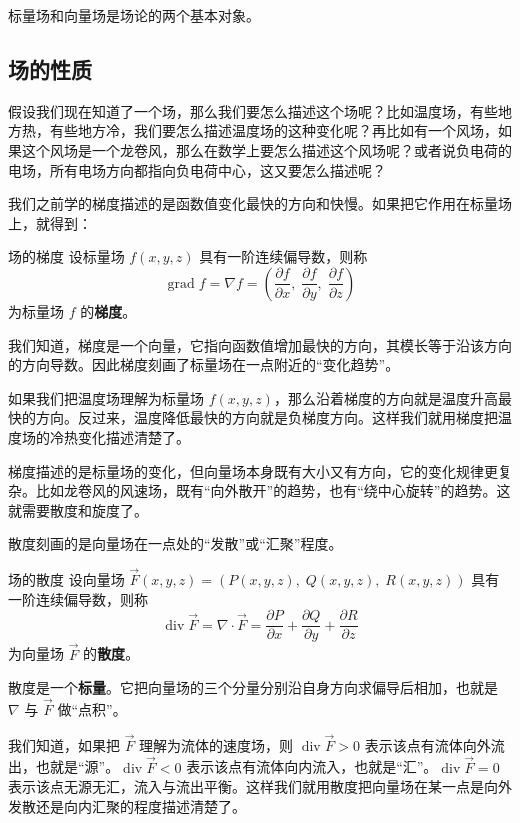 标量场和向量场是场论的两个基本对象。

\subsection{场的性质}
假设我们现在知道了一个场，那么我们要怎么描述这个场呢？比如温度场，有些地方热，有些地方冷，我们要怎么描述温度场的这种变化呢？再比如有一个风场，如果这个风场是一个龙卷风，那么在数学上要怎么描述这个风场呢？或者说负电荷的电场，所有电场方向都指向负电荷中心，这又要怎么描述呢？

我们之前学的梯度描述的是函数值变化最快的方向和快慢。如果把它作用在标量场上，就得到：

\begin{definition}{场的梯度}{}
  设标量场 \(f(x,y,z)\) 具有一阶连续偏导数，则称
  \[
  \operatorname{grad} f = \nabla f = \left(\frac{\partial f}{\partial x},\; \frac{\partial f}{\partial y},\; \frac{\partial f}{\partial z}\right)
  \]
  为标量场 \(f\) 的\textbf{梯度}。
\end{definition}

我们知道，梯度是一个向量，它指向函数值增加最快的方向，其模长等于沿该方向的方向导数。因此梯度刻画了标量场在一点附近的“变化趋势”。

如果我们把温度场理解为标量场 \(f(x,y,z)\)，那么沿着梯度的方向就是温度升高最快的方向。反过来，温度降低最快的方向就是负梯度方向。这样我们就用梯度把温度场的冷热变化描述清楚了。

梯度描述的是标量场的变化，但向量场本身既有大小又有方向，它的变化规律更复杂。比如龙卷风的风速场，既有“向外散开”的趋势，也有“绕中心旋转”的趋势。这就需要散度和旋度了。

散度刻画的是向量场在一点处的“发散”或“汇聚”程度。

\begin{definition}{场的散度}{}
  设向量场 \(\vec{F}(x,y,z)=(P(x,y,z),\;Q(x,y,z),\;R(x,y,z))\) 具有一阶连续偏导数，则称
  \[
  \operatorname{div}\vec{F} = \nabla \cdot \vec{F} = \frac{\partial P}{\partial x} + \frac{\partial Q}{\partial y} + \frac{\partial R}{\partial z}
  \]
  为向量场 \(\vec{F}\) 的\textbf{散度}。
\end{definition}

散度是一个\textbf{标量}。它把向量场的三个分量分别沿自身方向求偏导后相加，也就是 \(\nabla\) 与 \(\vec{F}\) 做“点积”。

我们知道，如果把 \(\vec{F}\) 理解为流体的速度场，则 \(\operatorname{div}\vec{F}>0\) 表示该点有流体向外流出，也就是“源”。\(\operatorname{div}\vec{F}<0\) 表示该点有流体向内流入，也就是“汇”。\(\operatorname{div}\vec{F}=0\) 表示该点无源无汇，流入与流出平衡。这样我们就用散度把向量场在某一点是向外发散还是向内汇聚的程度描述清楚了。

